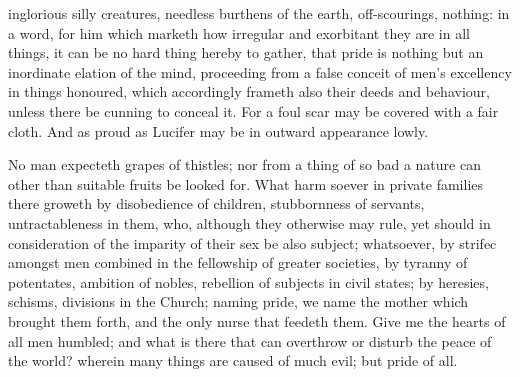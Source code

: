 inglorious silly creatures, needless burthens of the earth, off-scourings, nothing: in a word, for him which marketh how irregular and exorbitant they are in all things, it can be no hard thing hereby to gather, that pride is nothing but an inordinate elation of the mind, proceeding from a false conceit of men’s excellency in things honoured, which accordingly frameth also their deeds and behaviour, unless there be cunning to conceal it. For a foul scar may be covered with a fair cloth. And as proud as Lucifer may be in outward appearance lowly.

No man expecteth grapes of thistles; nor from a thing of so bad a nature can other than suitable fruits be looked for. What harm soever in private families there groweth by disobedience of children, stubbornness of servants, untractableness in them, who, although they otherwise may rule, yet should in consideration of the imparity of their sex be also subject; whatsoever, by strifec amongst men combined in the fellowship of greater societies, by tyranny of potentates, ambition of nobles, rebellion of subjects in civil states; by heresies, schisms, divisions in the Church; naming pride, we name the mother which brought them forth, and the only nurse that feedeth them. Give me the hearts of all men humbled; and what is there that can overthrow or disturb the peace of the world? wherein many things are caused of much evil; but pride of all.

